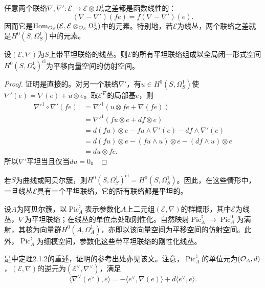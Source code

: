 任意两个联络$\nabla,\nabla':\mathcal E\to\mathcal E\otimes\Omega_S^1$之差都是函数线性的：
\[(\nabla-\nabla')(fe)=f(\nabla-\nabla')(e).\]
因而它是$\operatorname{Hom}_{\mathcal O_S}(\mathcal E,\mathcal E\otimes_{\mathcal O_S}\Omega_S^1)$中的元素。特别地，若$\mathcal E$为线丛，两个联络之差就是$H^0(S,\Omega_S^1)$中的元素。
\begin{lemma}\label{L17S1O6}
设$(\mathcal E,\nabla)$为$S$上带平坦联络的线丛。则$\mathcal E$的所有平坦联络组成以全局闭一形式空间$H^0(S,\Omega_S^1)^{\mathrm{cl}}$为平移向量空间的仿射空间。
\end{lemma}
\begin{proof}
证明是直接的。对另一个联络$\nabla'$，有$u\in H^0(S,\Omega_S^1)$使$\nabla'(e)=\nabla(e)+u\otimes e$。取$\mathcal E^\nabla$的局部基$e$，则
\[\begin{aligned}
\nabla'^1\circ\nabla'(fe)&=\nabla'^1(u\otimes fe+\nabla(fe))\\
&=\nabla'^1(fu\otimes e+df\otimes e)\\
&=d(fu)\otimes e-fu\wedge\nabla'(e)-df\wedge\nabla'(e)\\
&=d(fu)\otimes e-(fu\wedge u)\otimes e-(df\wedge u)\otimes e\\
&=du\otimes fe.
\end{aligned}\]
所以$\nabla'$平坦当且仅当$du=0$。
\end{proof}
\begin{example}\label{L17S1O7}
若$S$为曲线或阿贝尔簇，则$H^0(S,\Omega_S^1)^{\mathrm{cl}}=H^0(S,\Omega_S^1)$。因此，在这些情形中，一旦线丛$\mathcal E$具有一个平坦联络，它的所有联络都是平坦的。
\end{example}
\begin{proposition}\label{L17S1O8}
设$A$为阿贝尔簇，以$\operatorname{Pic}_A^\natural$表示参数化$A$上二元组$(\mathcal E,\nabla)$的群概形，其中$\mathcal E$为线丛，$\nabla$为平坦联络；在线丛的单位点处取刚性化。自然映射$\operatorname{Pic}_A^\natural\to\operatorname{Pic}_A^0$为满射，其核为向量群$H^0(A,\Omega_A^1)$，亦即以该向量空间为平移空间的仿射空间。此外，$\operatorname{Pic}_A^\natural$为细模空间，参数化这些带平坦联络的刚性化线丛。
\end{proposition}
是中定理2.1.2的重述，证明的参考出处亦见该文。注意，$\operatorname{Pic}_A^\natural$的单位元为$(\mathcal O_A,d)$，$(\mathcal E,\nabla)$的逆元为$(\mathcal E^\vee,\nabla^\vee)$，满足
\[\langle\nabla^\vee(e^\vee),e\rangle=-\langle e^\vee,\nabla(e)\rangle+d\langle e^\vee,e\rangle.\]
